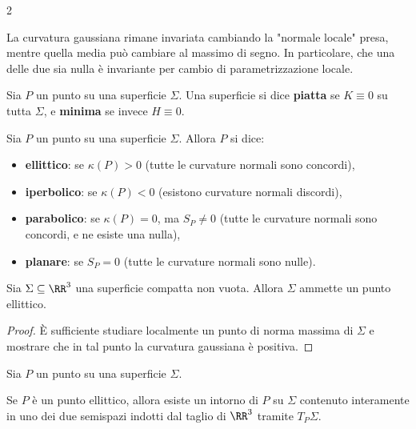 \begin{multicols*}{2}
    \begin{remark}
        La curvatura gaussiana rimane invariata cambiando la "normale locale" presa, mentre
        quella media può cambiare al massimo di segno. In particolare, che
        una delle due sia nulla è invariante per cambio di parametrizzazione locale.
    \end{remark}

    \begin{definition}
        Sia $P$ un punto su una superficie $\Sigma$. Una superficie
        si dice \textbf{piatta} se $K \equiv 0$ su tutta $\Sigma$, e
        \textbf{minima} se invece $H \equiv 0$.
    \end{definition}

    \begin{definition}
        Sia $P$ un punto su una superficie $\Sigma$. Allora $P$ si dice:
        \begin{itemize}
            \item \textbf{ellittico}: se $\kappa(P) > 0$ (tutte le curvature normali sono concordi),
            \item \textbf{iperbolico}: se $\kappa(P) < 0$ (esistono curvature normali discordi),
            \item \textbf{parabolico}: se $\kappa(P) = 0$, ma $S_P \neq 0$ (tutte le curvature normali sono concordi, e ne esiste una nulla),
            \item \textbf{planare}: se $S_P = 0$ (tutte le curvature normali sono nulle).
        \end{itemize}
    \end{definition}


    \begin{proposition}
        Sia $\Sigma \subseteq \RR^3$ una superficie compatta non vuota. Allora
        $\Sigma$ ammette un punto ellittico.
    \end{proposition}

    \begin{proof}
        È sufficiente studiare localmente un punto di norma massima di $\Sigma$ e
        mostrare che in tal punto la curvatura gaussiana è positiva.
    \end{proof}

    \begin{proposition}
        Sia $P$ un punto su una superficie $\Sigma$. \smallskip

        Se $P$ è un punto ellittico, allora esiste un intorno di $P$ su
        $\Sigma$ contenuto interamente in uno dei due semispazi indotti
        dal taglio di $\RR^3$ tramite $T_P \Sigma$. \smallskip


\end{proposition}
\end{multicols*}
